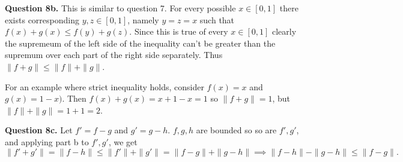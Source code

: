 \documentclass[letterpaper, reqno,11pt]{article}
\begin{document}
{\medskip\noindent\bf Question 8b.} This is similar to question 7. For every possible $x\in [0,1]$ there exists corresponding $y,z\in[0,1]$, namely $y=z=x$ such that $f(x)+g(x)\leq f(y)+g(z)$. Since this is true of every $x\in[0,1]$ clearly the supremeum of the left side of the inequality can't be greater than the supremum over each part of the right side separately. Thus $\|f+g\|\leq \|f\|+\|g\|$.

For an example where strict inequality holds, consider $f(x)=x$ and $g(x)=1-x)$. Then $f(x)+g(x)=x+1-x=1$ so $\|f+g\|=1$, but $\|f\|+\|g\|=1+1=2$.

{\medskip\noindent\bf Question 8c.} Let $f'=f-g$ and $g'=g-h$. $f,g,h$ are bounded so so are $f',g'$, and applying part b to $f',g'$, we get
\[
\|f'+g'\|=\|f-h\|\leq \|f'\|+\|g'\|=\|f-g\|+\|g-h\|\implies \|f-h\|-\|g-h\|\leq \|f-g\|
.\]

\newpage\phantom{blabla}
\newpage
\end{document}
